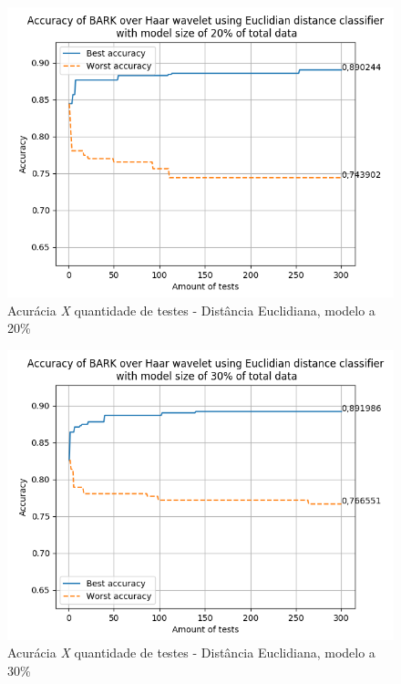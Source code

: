 \begin{myenv}{1.5}
		\newpage
		\begin{figure}[h]
			\centering
			\includegraphics{images/results/confusionMatrices/classifier_Euclidian_20}
			\caption{Acurácia \textit{X} quantidade de testes - Distância Euclidiana, modelo a 20\%}
			\label{fig:classifiereuclidian20}
		\end{figure}
		

		\newpage
		\begin{figure}[h]
			\centering
			\includegraphics{images/results/confusionMatrices/classifier_Euclidian_30}
			\caption{Acurácia \textit{X} quantidade de testes - Distância Euclidiana, modelo a 30\%}
			\label{fig:classifiereuclidian30}
		\end{figure}
		


\end{myenv}
